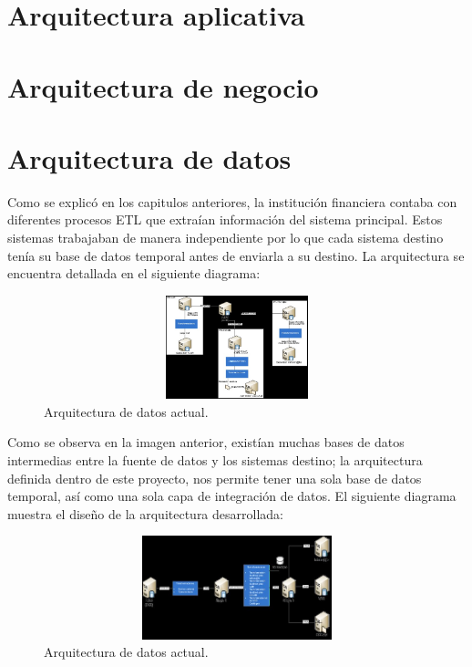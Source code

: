 \documentclass[a4paper,openright,12pt]{book}
\begin{document}
\section{Arquitectura aplicativa}


\section{Arquitectura de negocio}


\section{Arquitectura de datos}

Como se explicó en los capitulos anteriores, la institución financiera contaba
con diferentes procesos ETL que extraían información del sistema
principal. Estos sistemas trabajaban de manera independiente por lo que cada
sistema destino tenía su base de datos temporal antes de enviarla a su
destino. La arquitectura se encuentra detallada en el siguiente diagrama:

\begin{figure}[htb]
  \begin{center}
    \includegraphics[width=12cm, height=3cm, scale=0.5]{Arquitecturadatos_actual.jpg}
    \caption{Arquitectura de datos actual.}
    \label{fig:arquitecturaactual}
  \end{center}
\end{figure}

Como se observa en la imagen anterior, existían muchas bases de datos
intermedias entre la fuente de datos y los sistemas destino; la arquitectura
definida dentro de este proyecto, nos permite tener una sola base de datos
temporal, así como una sola capa de integración de datos. El siguiente diagrama
muestra el diseño de la arquitectura desarrollada:

\begin{figure}[htb]
  \begin{center}
    \includegraphics[width=12cm, height=3cm, scale=0.5]{Arquitectura_final.jpg}
    \caption{Arquitectura de datos actual.}
    \label{fig:Arquitecturafinal}
  \end{center}
\end{figure}
\end{document}
